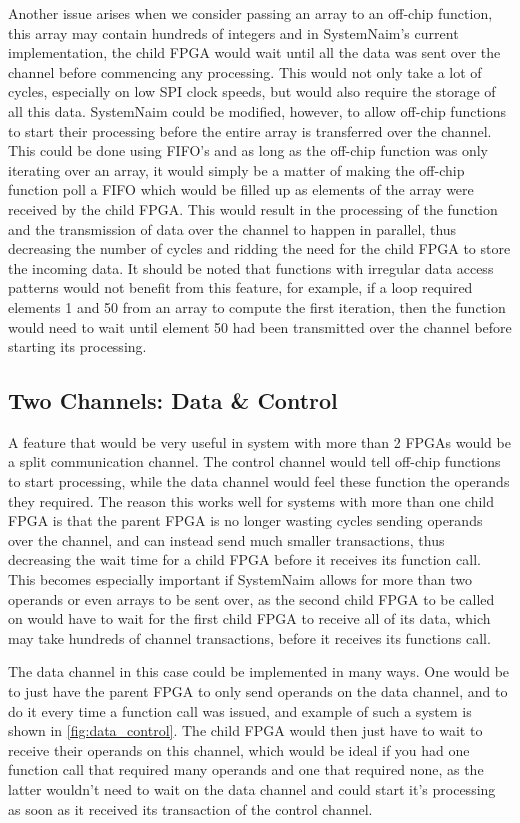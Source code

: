 Another issue arises when we consider passing an array to an off-chip function, this array may contain hundreds of integers and in SystemNaim's current implementation, the child FPGA would wait until all the data was sent over the channel before commencing any processing. This would not only take a lot of cycles, especially on low SPI clock speeds, but would also require the storage of all this data. SystemNaim could be modified, however, to allow off-chip functions to start their processing before the entire array is transferred over the channel. This could be done using FIFO's and as long as the off-chip function was only iterating over an array, it would simply be a matter of making the off-chip function poll a FIFO which would be filled up as elements of the array were received by the child FPGA. This would result in the processing of the function and the transmission of data over the channel to happen in parallel, thus decreasing the number of cycles and ridding the need for the child FPGA to store the incoming data. It should be noted that functions with irregular data access patterns would not benefit from this feature, for example, if a loop required elements 1 and 50 from an array to compute the first iteration, then the function would need to wait until element 50 had been transmitted over the channel before starting its processing.

\subsection{Two Channels: Data \& Control}

A feature that would be very useful in system with more than 2 FPGAs would be a split communication channel. The control channel would tell off-chip functions to start processing, while the data channel would feel these function the operands they required. The reason this works well for systems with more than one child FPGA is that the parent FPGA is no longer wasting cycles sending operands over the channel, and can instead send much smaller transactions, thus decreasing the wait time for a child FPGA before it receives its function call. This becomes especially important if SystemNaim allows for more than two operands or even arrays to be sent over, as the second child FPGA to be called on would have to wait for the first child FPGA to receive all of its data, which may take hundreds of channel transactions, before it receives its functions call. 

The data channel in this case could be implemented in many ways. One would be to just have the parent FPGA to only send operands on the data channel, and to do it every time a function call was issued, and example of such a system is shown in \autoref{fig:data_control}. The child FPGA would then just have to wait to receive their operands on this channel, which would be ideal if you had one function call that required many operands and one that required none, as the latter wouldn't need to wait on the data channel and could start it's processing as soon as it received its transaction of the control channel.

